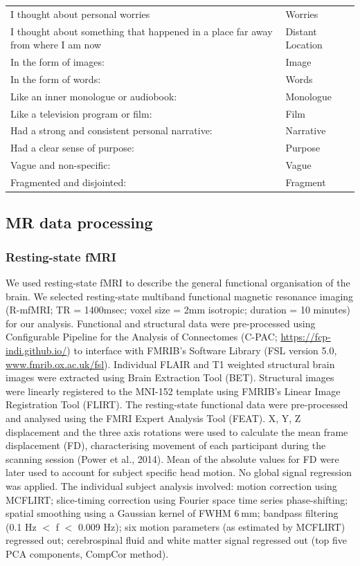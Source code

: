 \begin{table}
{\begin{tabular}{ l l}
I thought about personal worries&Worries\\
I thought about something that happened in a place far away from where I am now&Distant Location\\
In the form of images:&Image\\
In the form of words:&Words\\
Like an inner monologue or audiobook:&Monologue\\
Like a television program or film:&Film\\
Had a strong and consistent personal narrative:&Narrative\\
Had a clear sense of purpose:&Purpose\\
Vague and non-specific:&Vague\\
Fragmented and disjointed:&Fragment\\
\bottomrule
\end{tabular}
}
\end{table}

\linespacenormal
\subsection{MR data processing}
\label{study2:method:MRI}

\subsubsection{Resting-state fMRI}
We used resting-state fMRI to describe the general functional organisation of the brain. We selected resting-state multiband functional magnetic resonance imaging (R-mfMRI;  TR = 1400msec; voxel size = 2mm isotropic; duration = 10 minutes) for our analysis. Functional and structural data were pre-processed using Configurable Pipeline for the Analysis of Connectomes (C-PAC; \url{https://fcp-indi.github.io/}) to interface with FMRIB’s Software Library (FSL version 5.0, \url{www.fmrib.ox.ac.uk/fsl}). Individual FLAIR and T1 weighted structural brain images were extracted using Brain Extraction Tool (BET). Structural images were linearly registered to the MNI-152 template using FMRIB's Linear Image Registration Tool (FLIRT). The resting-state functional data were pre-processed and analysed using the FMRI Expert Analysis Tool (FEAT). X, Y, Z displacement and the three axis rotations were used to calculate the mean frame displacement (FD), characterising movement of each participant during the scanning session (Power et al., 2014). Mean of the absolute values for FD were later used to account for subject specific head motion. No global signal regression was applied. The individual subject analysis involved: motion correction using MCFLIRT; slice-timing correction using Fourier space time series phase-shifting; spatial smoothing using a Gaussian kernel of FWHM 6 mm; bandpass filtering (0.1 Hz $<$ f $<$ 0.009 Hz); six motion parameters (as estimated by MCFLIRT) regressed out; cerebrospinal fluid and white matter signal regressed out (top five PCA components, CompCor method).

